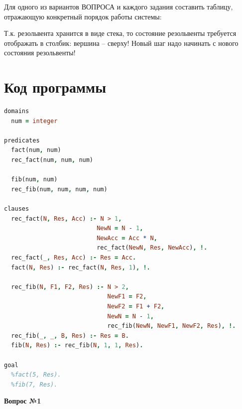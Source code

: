 \documentclass[14pt]{report}
\begin{document}
Для одного из вариантов ВОПРОСА и каждого задания составить таблицу,
отражающую конкретный порядок работы системы:

Т.к. резольвента хранится в виде стека, то состояние резольвенты требуется отображать
в столбик: вершина – сверху! Новый шаг надо начинать с нового состояния резольвенты!

\section*{Код программы}

\vspace{\baselineskip}

\begin{lstlisting}[language=Prolog]
domains
  num = integer

predicates
  fact(num, num)
  rec_fact(num, num, num)

  fib(num, num)
  rec_fib(num, num, num, num)

clauses
  rec_fact(N, Res, Acc) :- N > 1, 
                          NewN = N - 1, 
                          NewAcc = Acc * N, 
                          rec_fact(NewN, Res, NewAcc), !.
  rec_fact(_, Res, Acc) :- Res = Acc.
  fact(N, Res) :- rec_fact(N, Res, 1), !.

  rec_fib(N, F1, F2, Res) :- N > 2, 
                             NewF1 = F2, 
                             NewF2 = F1 + F2, 
                             NewN = N - 1, 
                             rec_fib(NewN, NewF1, NewF2, Res), !.
  rec_fib(_, _, B, Res) :- Res = B.
  fib(N, Res) :- rec_fib(N, 1, 1, Res).

goal
  %fact(5, Res).
  %fib(7, Res).
\end{lstlisting}

\vspace{\baselineskip}

\newpage

\textbf{Вопрос №1}\\
\end{document}
